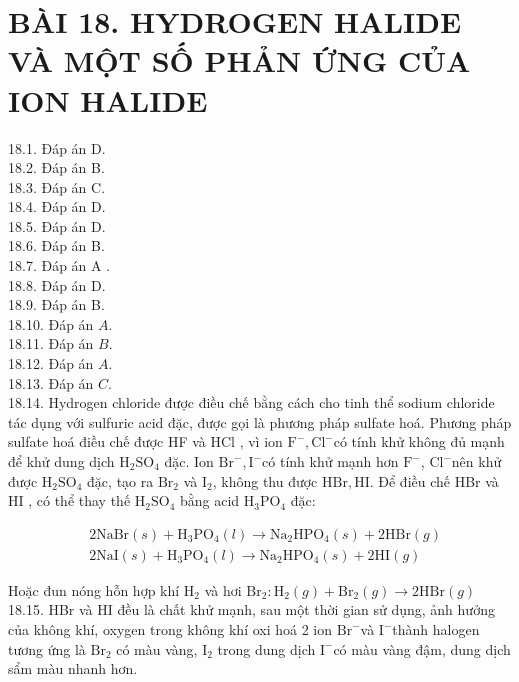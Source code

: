 \documentclass[10pt]{article}
\begin{document}
\section*{BÀI 18. HYDROGEN HALIDE VÀ MỘT SỐ PHẢN ỨNG CỦA ION HALIDE}
18.1. Đáp án D.\\
18.2. Đáp án B.\\
18.3. Đáp án C.\\
18.4. Đáp án D.\\
18.5. Đáp án D.\\
18.6. Đáp án B.\\
18.7. Đáp án A .\\
18.8. Đáp án D.\\
18.9. Đáp án B.\\
18.10. Đáp án $A$.\\
18.11. Đáp án $B$.\\
18.12. Đáp án $A$.\\
18.13. Đáp án $C$.\\
18.14. Hydrogen chloride được điều chế bằng cách cho tinh thể sodium chloride tác dụng với sulfuric acid đặc, được gọi là phương pháp sulfate hoá. Phương pháp sulfate hoá điều chế được HF và HCl , vì ion $\mathrm{F}^{-}, \mathrm{Cl}^{-}$có tính khử không đủ mạnh để khử dung dịch $\mathrm{H}_{2} \mathrm{SO}_{4}$ đặc. Ion $\mathrm{Br}^{-}, \mathrm{I}^{-}$có tính khử mạnh hơn $\mathrm{F}^{-}$, $\mathrm{Cl}^{-}$nên khử được $\mathrm{H}_{2} \mathrm{SO}_{4}$ đặc, tạo ra $\mathrm{Br}_{2}$ và $\mathrm{I}_{2}$, không thu được $\mathrm{HBr}, \mathrm{HI}$. Để điều chế HBr và HI , có thể thay thế $\mathrm{H}_{2} \mathrm{SO}_{4}$ bằng acid $\mathrm{H}_{3} \mathrm{PO}_{4}$ đặc:

$$
\begin{aligned}
& 2 \mathrm{NaBr}(s)+\mathrm{H}_{3} \mathrm{PO}_{4}(l) \rightarrow \mathrm{Na}_{2} \mathrm{HPO}_{4}(s)+2 \mathrm{HBr}(g) \\
& 2 \mathrm{NaI}(s)+\mathrm{H}_{3} \mathrm{PO}_{4}(l) \rightarrow \mathrm{Na}_{2} \mathrm{HPO}_{4}(s)+2 \mathrm{HI}(g)
\end{aligned}
$$

Hoặc đun nóng hỗn hợp khí $\mathrm{H}_{2}$ và hơi $\mathrm{Br}_{2}: \mathrm{H}_{2}(g)+\mathrm{Br}_{2}(g) \rightarrow 2 \mathrm{HBr}(g)$\\
18.15. HBr và HI đều là chất khử mạnh, sau một thời gian sử dụng, ảnh hưởng của không khí, oxygen trong không khí oxi hoá 2 ion $\mathrm{Br}^{-}$và $\mathrm{I}^{-}$thành halogen tương ứng là $\mathrm{Br}_{2}$ có màu vàng, $\mathrm{I}_{2}$ trong dung dịch $\mathrm{I}^{-}$có màu vàng đậm, dung dịch sẩm màu nhanh hơn.
\end{document}
